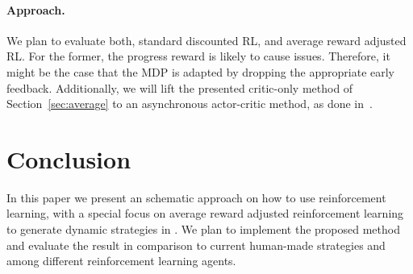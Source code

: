 \documentclass[envcountsame]{llncs}
\newcommand\MS[2][r]{\ifx t#1 \textcolor{blue}{[#2]}%
\else \begin{center}\textcolor{blue}{#2} \end{center} \fi}%
\begin{document}
\paragraph{Approach.} We plan to evaluate both, standard discounted RL, and average reward adjusted
RL\@. For the former, the progress reward is likely to cause issues. Therefore, it might be the case
that the MDP is adapted by dropping the appropriate early feedback. Additionally, we will lift the
presented critic-only method of Section~\ref{sec:average} to an asynchronous actor-critic method, as
done in~\cite{mnih2016asynchronous}. 






\section{Conclusion}\label{sec:conclusion}

In this paper we present an schematic approach on how to use reinforcement learning, with a special
focus on average reward adjusted reinforcement learning to generate dynamic strategies in \tct{}. We
plan to implement the proposed method and evaluate the result in comparison to current human-made
strategies and among different reinforcement learning agents.









\appendix
\end{document}
